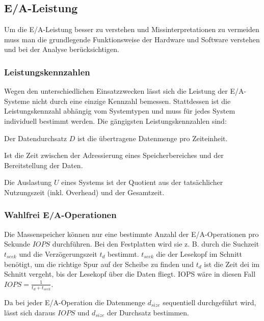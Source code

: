 \subsection{E/A-Leistung}
Um die E/A-Leistung besser zu verstehen und Missinterpretationen zu vermeiden muss man die grundlegende Funktionsweise der Hardware und Software verstehen und bei der Analyse berücksichtigen. 

\subsubsection{Leistungskennzahlen}
Wegen den unterschiedlichen Einsatzzwecken lässt sich die Leistung der E/A-Systeme nicht durch eine einzige Kennzahl bemessen. 
Stattdessen ist die Leistungskennzahl abhängig vom Systemtypen und muss für jedes System individuell bestimmt werden. 
Die gängigsten Leistungskennzahlen sind:

\begin{term}[Datendurchsatz] %
	Der Datendurchsatz $D$ ist die übertragene Datenmenge pro Zeiteinheit.
\end{term}

\begin{term}[Latenz]
	Ist die Zeit zwischen der Adressierung eines Speicherbereiches und der Bereitstellung der Daten.
\end{term}

\begin{term}[Auslastung]
	Die Auslastung $U$ eines Systems ist der Quotient aus der tatsächlicher Nutzungszeit (inkl. Overhead) und der Gesamtzeit. 
\end{term}


\subsubsection{Wahlfrei E/A-Operationen}
Die Massenspeicher können nur eine bestimmte Anzahl der E/A-Operationen pro Sekunde $IOPS$ durchführen. 
Bei den Festplatten wird sie z. B. durch die Suchzeit $t_{seek}$ und die Verzögerungszeit $t_{d}$ bestimmt. $t_{seek}$ die der Lesekopf im Schnitt benötigt, um die richtige Spur auf der Scheibe zu finden und $t_d$ ist die Zeit dei im Schnitt vergeht, bis der Lesekopf über die Daten fliegt. IOPS wäre in diesen Fall $IOPS = \frac{1}{t_d + t_{seek}}$.

Da bei jeder E/A-Operation die Datenmenge $d_{size}$ sequentiell durchgeführt wird, lässt sich daraus $IOPS$ und $d_{size}$ der Durchsatz bestimmen.

